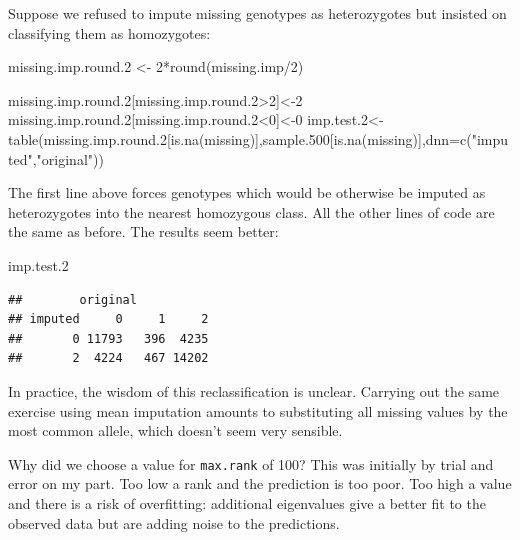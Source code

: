 \documentclass[
]{book}
\newenvironment{Shaded}{\begin{snugshade}}{\end{snugshade}}
\newcommand{\AttributeTok}[1]{\textcolor[rgb]{0.77,0.63,0.00}{#1}}
\newcommand{\DecValTok}[1]{\textcolor[rgb]{0.00,0.00,0.81}{#1}}
\newcommand{\FloatTok}[1]{\textcolor[rgb]{0.00,0.00,0.81}{#1}}
\newcommand{\FunctionTok}[1]{\textcolor[rgb]{0.00,0.00,0.00}{#1}}
\newcommand{\NormalTok}[1]{#1}
\newcommand{\OtherTok}[1]{\textcolor[rgb]{0.56,0.35,0.01}{#1}}
\newcommand{\SpecialCharTok}[1]{\textcolor[rgb]{0.00,0.00,0.00}{#1}}
\newcommand{\StringTok}[1]{\textcolor[rgb]{0.31,0.60,0.02}{#1}}
\begin{document}
Suppose we refused to impute missing genotypes as heterozygotes but insisted on classifying them as homozygotes:

\begin{Shaded}
\begin{Highlighting}[]
\NormalTok{missing.imp.round}\FloatTok{.2} \OtherTok{\textless{}{-}} \DecValTok{2}\SpecialCharTok{*}\FunctionTok{round}\NormalTok{(missing.imp}\SpecialCharTok{/}\DecValTok{2}\NormalTok{)}

\NormalTok{missing.imp.round}\FloatTok{.2}\NormalTok{[missing.imp.round}\FloatTok{.2}\SpecialCharTok{\textgreater{}}\DecValTok{2}\NormalTok{]}\OtherTok{\textless{}{-}}\DecValTok{2}
\NormalTok{missing.imp.round}\FloatTok{.2}\NormalTok{[missing.imp.round}\FloatTok{.2}\SpecialCharTok{\textless{}}\DecValTok{0}\NormalTok{]}\OtherTok{\textless{}{-}}\DecValTok{0}
\NormalTok{imp.test}\FloatTok{.2}\OtherTok{\textless{}{-}}\FunctionTok{table}\NormalTok{(missing.imp.round}\FloatTok{.2}\NormalTok{[}\FunctionTok{is.na}\NormalTok{(missing)],sample}\FloatTok{.500}\NormalTok{[}\FunctionTok{is.na}\NormalTok{(missing)],}\AttributeTok{dnn=}\FunctionTok{c}\NormalTok{(}\StringTok{"imputed"}\NormalTok{,}\StringTok{"original"}\NormalTok{))}
\end{Highlighting}
\end{Shaded}

The first line above forces genotypes which would be otherwise be imputed as heterozygotes into the nearest homozygous class. All the other lines of code are the same as before. The results seem better:

\begin{Shaded}
\begin{Highlighting}[]
\NormalTok{imp.test}\FloatTok{.2}
\end{Highlighting}
\end{Shaded}

\begin{verbatim}
##        original
## imputed     0     1     2
##       0 11793   396  4235
##       2  4224   467 14202
\end{verbatim}

In practice, the wisdom of this reclassification is unclear. Carrying out the same exercise using mean imputation amounts to substituting all missing values by the most common allele, which doesn't seem very sensible.

Why did we choose a value for \texttt{max.rank} of 100? This was initially by trial and error on my part. Too low a rank and the prediction is too poor. Too high a value and there is a risk of overfitting: additional eigenvalues give a better fit to the observed data but are adding noise to the predictions.
\end{document}
